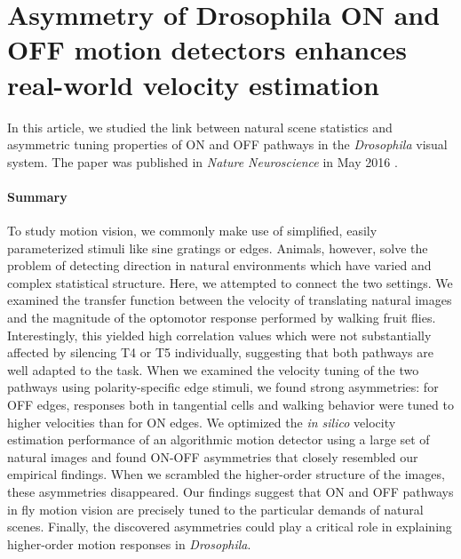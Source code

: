 \section[Asymmetry of \textit{Drosophila} ON and OFF motion detectors enhances real-world velocity estimation]{Asymmetry of Drosophila ON and OFF motion detectors enhances real-world velocity estimation}
\label{sct:manuscript_leonhardt}

In this article, we studied the link between natural scene statistics and asymmetric tuning properties of ON and OFF pathways in the \textit{Drosophila} visual system. The paper was published in \textit{Nature Neuroscience} in May 2016 \citep{Leonhardt:2016ex}.

\paragraph{Summary}
To study motion vision, we commonly make use of simplified, easily parameterized stimuli like sine gratings or edges. Animals, however, solve the problem of detecting direction in natural environments which have varied and complex statistical structure. Here, we attempted to connect the two settings. We examined the transfer function between the velocity of translating natural images and the magnitude of the optomotor response performed by walking fruit flies. Interestingly, this yielded high correlation values which were not substantially affected by silencing T4 or T5 individually, suggesting that both pathways are well adapted to the task. When we examined the velocity tuning of the two pathways using polarity-specific edge stimuli, we found strong asymmetries: for OFF edges, responses both in tangential cells and walking behavior were tuned to higher velocities than for ON edges. We optimized the \textit{in silico} velocity estimation performance of an algorithmic motion detector using a large set of natural images and found ON-OFF asymmetries that closely resembled our empirical findings. When we scrambled the higher-order structure of the images, these asymmetries disappeared. Our findings suggest that ON and OFF pathways in fly motion vision are precisely tuned to the particular demands of natural scenes. Finally, the discovered asymmetries could play a critical role in explaining higher-order motion responses in \textit{Drosophila}.

